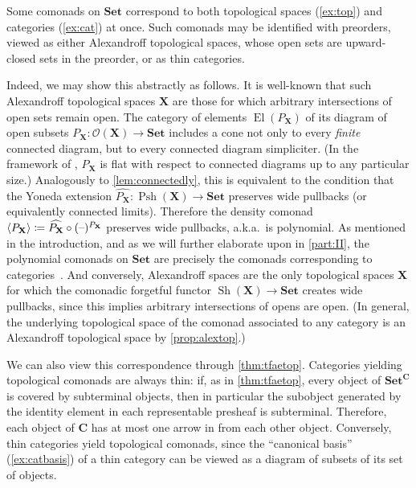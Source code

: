 \documentclass[11pt, oneside, article]{memoir}
\theoremstyle{plain}
\theoremstyle{definition}
\theoremstyle{remark}
\newenvironment{remark}
{\renewcommand\qedsymbol{$\lrcorner$}%
  \pushQED{\qed}\myremark}
{\popQED\endmyremark}
\DeclareMathOperator{\Sh}{Sh}
\DeclareMathOperator{\Psh}{Psh}
\DeclareMathOperator{\El}{El}
\DeclarePairedDelimiter{\gen}{\langle}{\rangle}
\newcommand{\dash}{{\mathord{\text{--}}}}
\newcommand{\namedcat}[1]{\mathbf{#1}}
\newcommand{\cat}[1]{\mathbf{#1}}
\newcommand{\spa}[1]{\mathbf{#1}}
\newcommand{\Set}{\namedcat{Set}}
\newcommand{\extend}[1]{\widehat{#1}}
\newcommand{\nerve}[1]{(\dash)^{#1}}
\newcommand{\ph}[1]{#1}
\newcommand{\fun}[2]{{#2}^{#1}}
\newcommand{\topbasis}[1]{\pP_{#1}}
\newcommand{\bC}{\cat{C}}
\newcommand{\pP}{\ph{P}}
\newcommand{\tX}{\spa{X}}
\newcommand{\opens}[1]{\mathcal{O}(#1)}
\begin{document}
\begin{remark}\label{rem:preorders}
  Some comonads on $\Set$ correspond to both topological spaces
  (\cref{ex:top}) and categories (\cref{ex:cat}) at once. Such
  comonads may be identified with preorders, viewed as either
  Alexandroff topological spaces, whose open sets are upward-closed
  sets in the preorder, or as thin categories.

  Indeed, we may show this abstractly as follows. It is well-known
  that such Alexandroff topological spaces $\tX$ are those for which
  arbitrary intersections of open sets remain open. The category of
  elements $\El(\topbasis{\tX})$ of its diagram of open subsets
  $\topbasis{\tX} \colon \opens{\tX}\to \Set$ includes a cone not only to
  every \emph{finite} connected diagram, but to every connected
  diagram simpliciter. (In the framework of
  \cite{adamek-borceux-lack-rosicky}, $\topbasis{\tX}$ is flat with respect to
  connected diagrams up to any particular size.)  Analogously to
  \cref{lem:connectedly}, this is equivalent to the condition that the
  Yoneda extension $\extend{\topbasis{\tX}} \colon \Psh(\tX) \to \Set$
  preserves wide pullbacks (or equivalently connected
  limits). Therefore the density comonad
  $\gen{\topbasis{\tX}} \coloneqq \extend{\topbasis{\tX}} \circ
  \nerve{{\topbasis{\tX}}}$ preserves wide pullbacks, a.k.a.\ is
  polynomial. As mentioned in the introduction, and as we will further
  elaborate upon in \cref{part:II}, the polynomial comonads on $\Set$
  are precisely the comonads corresponding to
  categories~\cite{ahman-uustalu}. And conversely, Alexandroff spaces
  are the only topological spaces $\tX$ for which the comonadic
  forgetful functor $\Sh(\tX) \to \Set$ creates wide pullbacks, since
  this implies arbitrary intersections of opens are open. (In general,
  the underlying topological space of the comonad associated to any
  category is an Alexandroff topological space by
  \cref{prop:alextop}.)

  We can also view this correspondence through
  \cref{thm:tfaetop}. Categories yielding topological comonads are
  always thin: if, as in \cref{thm:tfaetop}, every object of
  $\fun{\bC}{\Set}$ is covered by subterminal objects, then in
  particular the subobject generated by the identity element in each
  representable presheaf is subterminal. Therefore, each object of
  $\bC$ has at most one arrow in from each other object. Conversely,
  thin categories yield topological comonads, since the ``canonical
  basis'' (\cref{ex:catbasis}) of a thin category can be viewed as a
  diagram of subsets of its set of objects.


\end{remark}
\end{document}
